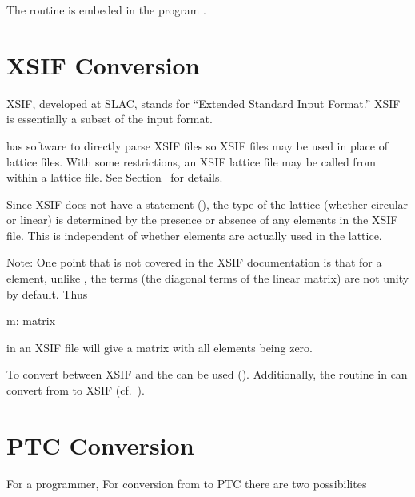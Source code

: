 The  routine is embeded in the program
.

\section{XSIF Conversion}
\label{s:xsif.convert}

XSIF\cite{b:xsif}, developed at SLAC, stands for ``Extended Standard
Input Format.''  XSIF is essentially a subset of the
\mad\cite{b:maduser} input format.

\bmad has software to directly parse XSIF files so XSIF files may be
used in place of \bmad lattice files.  With some restrictions, an XSIF
lattice file may be called from within a \bmad lattice file. See
Section~ for details.

Since XSIF does not have a  statement
(), the type of the lattice (whether circular or linear)
is determined by the presence or absence of any  elements
in the XSIF file. This is independent of whether  elements
are actually used in the lattice.

Note: One point that is not covered in the XSIF documentation is that
for a  element, unlike \mad, the  terms (the
diagonal terms of the linear matrix) are not unity by default. Thus
\begin{example}
  m: matrix
\end{example}
in an XSIF file will give a matrix with all elements being zero.

To convert between XSIF and \bmad the  can be used (). Additionally, the
 routine in \bmad can convert from \bmad to
XSIF (cf.~).

\section{PTC Conversion}
\label{s:ptc.convert}

For a programmer, 
For conversion from \bmad to PTC there are two possibilites

